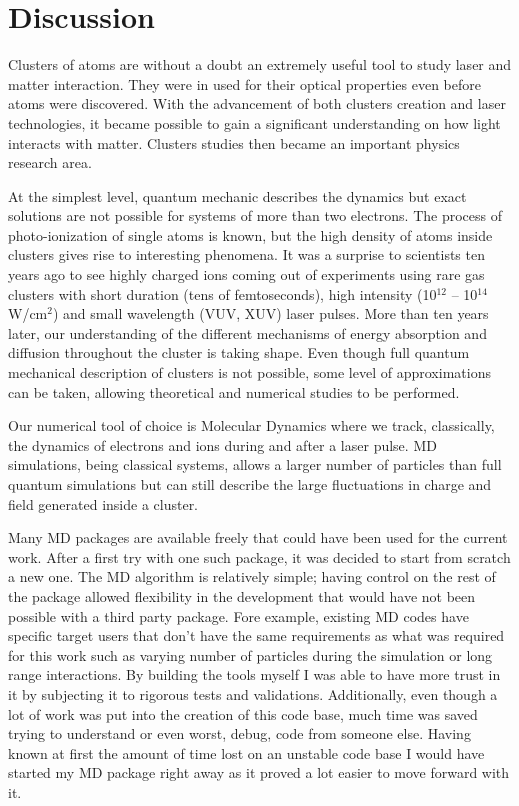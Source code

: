\section{Discussion}

Clusters of atoms are without a doubt an extremely useful tool to study
laser and matter interaction. They were in used for their optical properties
even before atoms were discovered. With the advancement of both clusters creation
and laser technologies, it became possible to gain a significant understanding
on how light interacts with matter. Clusters studies then became an important
physics research area.

At the simplest level, quantum mechanic describes the dynamics but exact solutions
are not possible for systems of more than two electrons.
The process of photo-ionization of single atoms is known, but the high density
of atoms inside clusters gives rise to interesting phenomena. It was a surprise
to scientists ten years ago to see highly charged ions coming out of experiments
using rare gas clusters with short duration (tens of femtoseconds), high intensity
(10$^{12}$ -- 10$^{14}$ W/cm$^2$) and small wavelength (VUV, XUV) laser pulses.
More than ten years later, our understanding of the different mechanisms of energy
absorption and diffusion throughout the cluster is taking shape. Even though full
quantum mechanical description of clusters is not possible, some level of approximations
can be taken, allowing theoretical and numerical studies to be performed.

Our numerical tool of choice is Molecular Dynamics where we track, classically,
the dynamics of electrons and ions during and after a laser pulse. MD simulations,
being classical systems, allows a larger number of particles than full quantum
simulations but can still describe the large fluctuations in charge and field
generated inside a cluster.

Many MD packages are available freely that could have been used for
the current work. After a first try with one such package, it was decided to
start from scratch a new one. The MD algorithm is relatively simple; having
control on the rest of the package allowed flexibility in the development that
would have not been possible with a third party package. Fore example, existing
MD codes have specific target users that don't have the same requirements as what
was required for this work such as varying number of particles during the
simulation or long range interactions. By building the tools myself I was able
to have more trust in it by subjecting it to rigorous tests and validations.
Additionally, even though a lot of work was put into the creation of this code
base, much time was saved trying to understand or even worst, debug, code from
someone else. Having known at first the amount of time lost on an unstable code
base I would have started my MD package right away as it proved a lot easier
to move forward with it.


